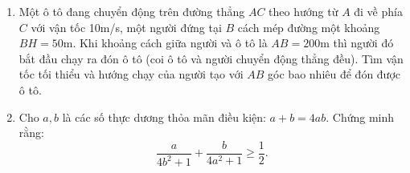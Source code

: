 \begin{ex} %
	\begin{enumerate}
		\item[a)] Một ô tô đang chuyển động trên đường thẳng $AC$ theo hướng từ $A$ đi về phía $C$ với vận tốc 10m/s, một người đứng tại $B$ cách mép đường một khoảng $BH=50\text{m}$. Khi khoảng cách giữa người và ô tô là $AB=200\text{m}$ thì người đó bắt đầu chạy ra đón ô tô (coi ô tô và người chuyển động thẳng đều). Tìm vận tốc tối thiểu và hướng chạy của người tạo với $AB$ góc bao nhiêu để đón được ô tô.
		\item[b)] Cho $a, b$ là các số thực dương thỏa mãn điều kiện: $a+b=4ab$. Chứng minh rằng:
		$$ \frac{a}{4b^2+1} + \frac{b}{4a^2+1} \ge \frac{1}{2}. $$
	\end{enumerate}
\end{ex}

